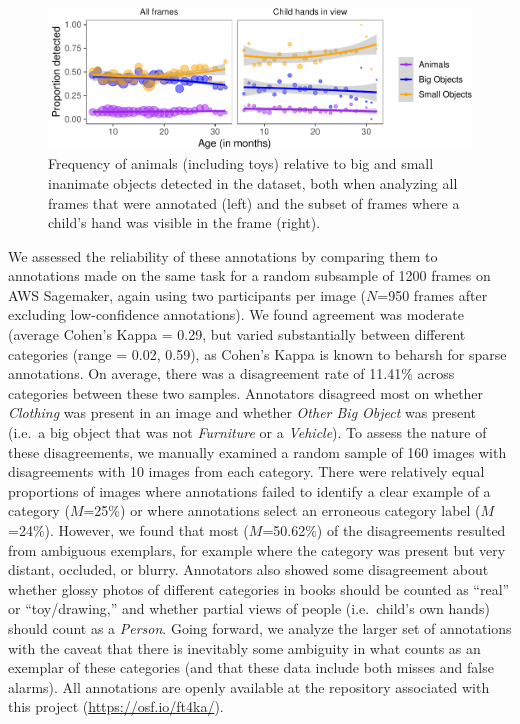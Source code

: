 \documentclass[10pt, letterpaper]{article}
\newenvironment{CodeChunk}{}{}
\begin{document}
\begin{CodeChunk}
\begin{figure}[h]

{\centering \includegraphics{figs/anim_size-1} 

}

\caption[Frequency of animals (including toys) relative to big and small inanimate objects detected in the dataset, both when analyzing all frames that were annotated (left) and the subset of frames where a child's hand was visible in the frame (right)]{Frequency of animals (including toys) relative to big and small inanimate objects detected in the dataset, both when analyzing all frames that were annotated (left) and the subset of frames where a child's hand was visible in the frame (right).}\label{fig:anim_size}
\end{figure}
\end{CodeChunk}

We assessed the reliability of these annotations by comparing them to
annotations made on the same task for a random subsample of 1200 frames
on AWS Sagemaker, again using two participants per image (\(N\)=950
frames after excluding low-confidence annotations). We found agreement
was moderate (average Cohen's Kappa = 0.29, but varied substantially
between different categories (range = 0.02, 0.59), as Cohen's Kappa is
known to beharsh for sparse annotations. On average, there was a
disagreement rate of 11.41\% across categories between these two
samples. Annotators disagreed most on whether \emph{Clothing} was
present in an image and whether \emph{Other Big Object} was present
(i.e.~a big object that was not \emph{Furniture} or a \emph{Vehicle}).
To assess the nature of these disagreements, we manually examined a
random sample of 160 images with disagreements with 10 images from each
category. There were relatively equal proportions of images where
annotations failed to identify a clear example of a category
(\(M\)=25\%) or where annotations select an erroneous category label
(\(M\)=24\%). However, we found that most (\(M\)=50.62\%) of the
disagreements resulted from ambiguous exemplars, for example where the
category was present but very distant, occluded, or blurry. Annotators
also showed some disagreement about whether glossy photos of different
categories in books should be counted as ``real'' or ``toy/drawing,''
and whether partial views of people (i.e.~child's own hands) should
count as a \emph{Person}. Going forward, we analyze the larger set of
annotations with the caveat that there is inevitably some ambiguity in
what counts as an exemplar of these categories (and that these data
include both misses and false alarms). All annotations are openly
available at the repository associated with this project
(\url{https://osf.io/ft4ka/}).
\end{document}
